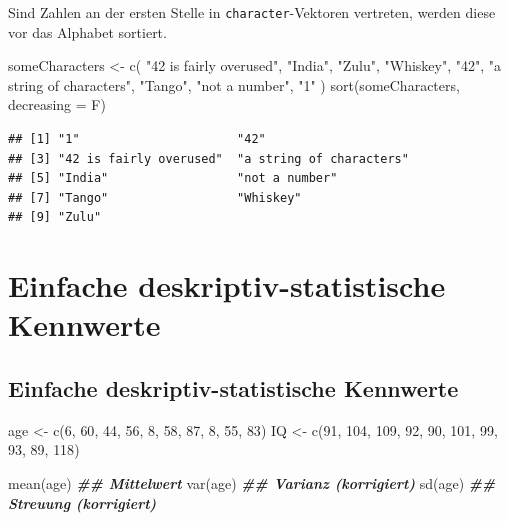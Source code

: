 \documentclass[
]{book}
\newenvironment{Shaded}{\begin{snugshade}}{\end{snugshade}}
\newcommand{\AttributeTok}[1]{\textcolor[rgb]{0.77,0.63,0.00}{#1}}
\newcommand{\DecValTok}[1]{\textcolor[rgb]{0.00,0.00,0.81}{#1}}
\newcommand{\DocumentationTok}[1]{\textcolor[rgb]{0.56,0.35,0.01}{\textbf{\textit{#1}}}}
\newcommand{\FunctionTok}[1]{\textcolor[rgb]{0.00,0.00,0.00}{#1}}
\newcommand{\NormalTok}[1]{#1}
\newcommand{\OtherTok}[1]{\textcolor[rgb]{0.56,0.35,0.01}{#1}}
\newcommand{\StringTok}[1]{\textcolor[rgb]{0.31,0.60,0.02}{#1}}
\begin{document}
Sind Zahlen an der ersten Stelle in \texttt{character}-Vektoren vertreten, werden diese vor das Alphabet sortiert.

\begin{Shaded}
\begin{Highlighting}[]
\NormalTok{someCharacters }\OtherTok{\textless{}{-}} \FunctionTok{c}\NormalTok{(}
  \StringTok{"42 is fairly overused"}\NormalTok{,}
  \StringTok{"India"}\NormalTok{,}
  \StringTok{"Zulu"}\NormalTok{,}
  \StringTok{"Whiskey"}\NormalTok{,}
  \StringTok{"42"}\NormalTok{,}
  \StringTok{"a string of characters"}\NormalTok{,}
  \StringTok{"Tango"}\NormalTok{,}
  \StringTok{"not a number"}\NormalTok{,}
  \StringTok{"1"}
\NormalTok{)}
\FunctionTok{sort}\NormalTok{(someCharacters, }\AttributeTok{decreasing =}\NormalTok{ F)}
\end{Highlighting}
\end{Shaded}

\begin{verbatim}
## [1] "1"                      "42"                    
## [3] "42 is fairly overused"  "a string of characters"
## [5] "India"                  "not a number"          
## [7] "Tango"                  "Whiskey"               
## [9] "Zulu"
\end{verbatim}

\hypertarget{einfache-deskriptiv-statistische-kennwerte}{%
\section{Einfache deskriptiv-statistische Kennwerte}\label{einfache-deskriptiv-statistische-kennwerte}}

\hypertarget{einfache-deskriptiv-statistische-kennwerte-1}{%
\subsection{Einfache deskriptiv-statistische Kennwerte}\label{einfache-deskriptiv-statistische-kennwerte-1}}

\begin{Shaded}
\begin{Highlighting}[]
\NormalTok{age }\OtherTok{\textless{}{-}} \FunctionTok{c}\NormalTok{(}\DecValTok{6}\NormalTok{, }\DecValTok{60}\NormalTok{, }\DecValTok{44}\NormalTok{, }\DecValTok{56}\NormalTok{, }\DecValTok{8}\NormalTok{, }\DecValTok{58}\NormalTok{, }\DecValTok{87}\NormalTok{, }\DecValTok{8}\NormalTok{, }\DecValTok{55}\NormalTok{, }\DecValTok{83}\NormalTok{)}
\NormalTok{IQ }\OtherTok{\textless{}{-}} \FunctionTok{c}\NormalTok{(}\DecValTok{91}\NormalTok{, }\DecValTok{104}\NormalTok{, }\DecValTok{109}\NormalTok{, }\DecValTok{92}\NormalTok{, }\DecValTok{90}\NormalTok{, }\DecValTok{101}\NormalTok{, }\DecValTok{99}\NormalTok{, }\DecValTok{93}\NormalTok{, }\DecValTok{89}\NormalTok{, }\DecValTok{118}\NormalTok{)}

\FunctionTok{mean}\NormalTok{(age)  }\DocumentationTok{\#\# Mittelwert}
\FunctionTok{var}\NormalTok{(age)  }\DocumentationTok{\#\# Varianz (korrigiert)}
\FunctionTok{sd}\NormalTok{(age) }\DocumentationTok{\#\# Streuung (korrigiert)}
\end{Highlighting}
\end{Shaded}
\end{document}
